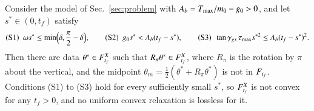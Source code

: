 \begin{theorem}\label{thm:Bstar}
Consider the model of Sec.~\ref{sec:problem} with $A_b=T_{\max}/m_0-g_0>0$, and let $s^*\in(0,t_f)$ satisfy
\begin{equation}\label{eq:S}
\text{(S1)}\ \ \omega s^*\le\min\Bigl(\delta,\frac\pi2-\delta\Bigr),\qquad
\text{(S2)}\ \ g_0s^*<A_b(t_f-s^*),\qquad
\text{(S3)}\ \ \tan\gamma_{gs}\,\tau_{\max}s^{*2}\le A_b(t_f-s^*)^2 .
\end{equation}
Then there are data $\theta^*\in F^{X}_{t_f}$ such that $R_\pi\theta^*\in F^{X}_{t_f}$, where $R_\pi$ is the rotation by $\pi$ about the
vertical, and the midpoint $\theta_m=\tfrac12(\theta^*+R_\pi\theta^*)$ is not in $F_{t_f}$. Conditions (S1) to (S3) hold for every
sufficiently small $s^*$, so $F^{X}_{t_f}$ is not convex for any $t_f>0$, and no uniform convex relaxation is lossless for it.
\end{theorem}
